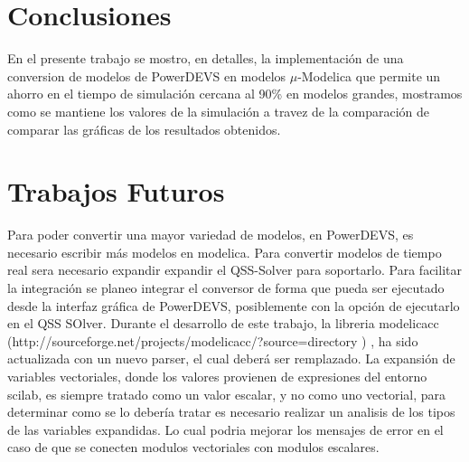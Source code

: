 
\section{Conclusiones}

	En el presente trabajo se mostro, en detalles, la implementación de una conversion de modelos de PowerDEVS en modelos $\mu$-Modelica que permite un ahorro en el tiempo de simulación 
	cercana al 90\% en modelos grandes, mostramos como se mantiene los valores de la simulación a travez de la comparación de comparar las gráficas de los resultados obtenidos.

\section{Trabajos Futuros}
	Para poder convertir una mayor variedad de modelos, en PowerDEVS, es necesario escribir más modelos en modelica.
	Para convertir modelos de tiempo real sera necesario expandir expandir el QSS-Solver para soportarlo.
	Para facilitar la integración se planeo integrar el conversor de forma que pueda ser ejecutado desde la interfaz gráfica de PowerDEVS, posiblemente con la opción de ejecutarlo en el QSS SOlver.
	Durante el desarrollo de este trabajo, la libreria modelicacc (http://sourceforge.net/projects/modelicacc/?source=directory ) , ha sido actualizada con un nuevo parser, el cual deberá ser remplazado.
	La expansión de variables vectoriales, donde los valores provienen de expresiones del entorno scilab, es siempre tratado como un valor escalar, y no como uno vectorial, para determinar como se lo debería tratar es necesario realizar un analisis de los tipos de las variables expandidas. Lo cual podria mejorar los mensajes de error en el caso de que se conecten modulos vectoriales con modulos escalares.
